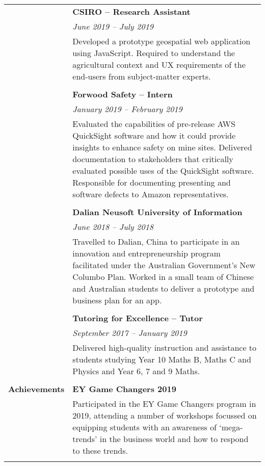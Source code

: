 \documentclass[a4paper]{article}
\begin{document}
\begin{longtable}{r p{13.5cm}}
										\vline & \textbf{CSIRO – Research Assistant} \\
										\vline & \textit{June 2019 – July 2019} \\
										\vline & Developed a prototype geospatial web application using JavaScript. Required to understand the agricultural context and UX requirements of the end-users from subject-matter experts. \\
										\vline & \\
										
										\vline & \textbf{Forwood Safety – Intern} \\
										\vline & \textit{January 2019 – February 2019} \\
										\vline & Evaluated the capabilities of pre-release AWS QuickSight software and how it could provide insights to enhance safety on mine sites. Delivered documentation to stakeholders that critically evaluated possible uses of the QuickSight software. Responsible for documenting presenting and software defects to Amazon representatives. \\
										\vline & \\
										
										\vline & \textbf{Dalian Neusoft University of Information} \\
										\vline & \textit{June 2018 – July 2018} \\
										\vline & Travelled to Dalian, China to participate in an innovation and entrepreneurship program facilitated under the Australian Government’s New Columbo Plan. Worked in a small team of Chinese and Australian students to deliver a prototype and business plan for an app. \\
										\vline & \\
										
										\vline & \textbf{Tutoring for Excellence – Tutor} \\
										\vline & \textit{September 2017 – January 2019} \\
										\vline & Delivered high-quality instruction and assistance to students studying Year 10 Maths B, Maths C and Physics and Year 6, 7 and 9 Maths. \\
										& \\
										
	\textbf{Achievements} 	\vline & \textbf{EY Game Changers 2019} \\
										\vline & Participated in the EY Game Changers program in 2019, attending a number of workshops focussed on equipping students with an awareness of ‘mega-trends’ in the business world and how to respond to these trends. \\
										\vline & \\
										

\end{longtable}
\end{document}
